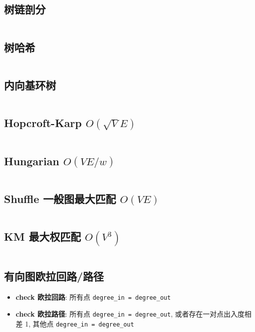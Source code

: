 \documentclass[titlepage, a4paper, 11pt]{article}
\begin{document}
\begin{spacing}{1.15}
				\subsection{树链剖分}
					\inputminted{cpp}{src/TreeandGraph/HLD.cpp}
				\subsection{树哈希}
					
					\inputminted{cpp}{src/TreeandGraph/tree_hash.cpp}
				\subsection{内向基环树}
					\inputminted{cpp}{src/TreeandGraph/内向基环树.cpp}
				\subsection{Hopcroft-Karp $O(\sqrt{V} E)$}
					\inputminted[highlightlines={13}]{cpp}{src/TreeandGraph/hk_skip2004.cpp}
				\subsection{Hungarian $O(V E / w)$}
					\inputminted{cpp}{src/TreeandGraph/Hungarian.cpp}
				\subsection{Shuffle 一般图最大匹配 $O(V E)$}
					\inputminted{cpp}{src/TreeandGraph/一般图最大匹配-shuffle.cpp}
				\subsection{KM 最大权匹配 $O(V^3)$}
					\inputminted{cpp}{src/TreeandGraph/KM.cpp}
				\subsection{有向图欧拉回路/路径}
					\begin{itemize}
						\item \textbf{check 欧拉回路}: 所有点 \texttt{degree\_in = degree\_out}
						\item \textbf{check 欧拉路径}: 所有点 \texttt{degree\_in = degree\_out}, 或者存在一对点出入度相差 1, 其他点 \texttt{degree\_in = degree\_out}
					\end{itemize}
					\inputminted{cpp}{src/TreeandGraph/EulerGraphDir.cpp}

\end{spacing}
\end{document}

